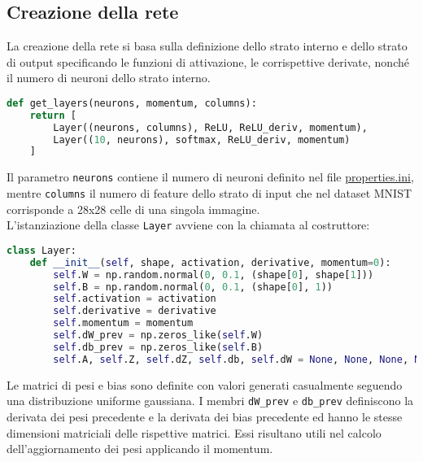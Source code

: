 \subsection{Creazione della rete}
La creazione della rete si basa sulla definizione dello strato interno e dello strato di output specificando le funzioni di attivazione, le corrispettive derivate, nonché il numero di neuroni dello strato interno.
\begin{lstlisting}[language=Python]
def get_layers(neurons, momentum, columns):
    return [
        Layer((neurons, columns), ReLU, ReLU_deriv, momentum), 
        Layer((10, neurons), softmax, ReLU_deriv, momentum)
    ]
\end{lstlisting}
Il parametro \texttt{neurons} contiene il numero di neuroni definito nel file \underline{properties.ini}, mentre \texttt{columns} il numero di feature dello strato di input che nel dataset MNIST corrisponde a 28x28 celle di una singola immagine. \\
L'istanziazione della classe \texttt{Layer} avviene con la chiamata al costruttore:
\begin{lstlisting}[language=Python]
class Layer:
    def __init__(self, shape, activation, derivative, momentum=0):
        self.W = np.random.normal(0, 0.1, (shape[0], shape[1]))
        self.B = np.random.normal(0, 0.1, (shape[0], 1))
        self.activation = activation
        self.derivative = derivative
        self.momentum = momentum
        self.dW_prev = np.zeros_like(self.W)
        self.db_prev = np.zeros_like(self.B)
        self.A, self.Z, self.dZ, self.db, self.dW = None, None, None, None, None
\end{lstlisting}
Le matrici di pesi e bias sono definite con valori generati casualmente seguendo una distribuzione uniforme gaussiana. I membri \texttt{dW\_prev} e \texttt{db\_prev} definiscono la derivata dei pesi precedente e la derivata dei bias precedente ed hanno le stesse dimensioni matriciali delle rispettive matrici. Essi risultano utili nel calcolo dell'aggiornamento dei pesi applicando il momentum. \\

